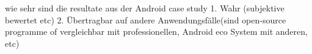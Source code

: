 wie sehr sind die resultate aus der Android case study 1. Wahr (subjektive bewertet etc) 2. Übertragbar auf andere Anwendungsfälle(sind open-source programme of vergleichbar mit professionellen, Android eco System mit anderen, etc)

